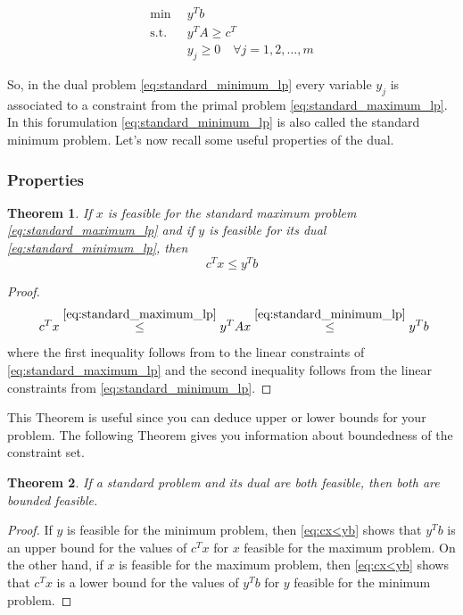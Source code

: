 \documentclass[a4paper,12pt]{article}
\newtheorem{Teo}{Theorem}
\begin{document}
\begin{equation}
\begin{aligned}  
\min \enspace &y^{T}b \\
\text{s.t.} \enspace &y^TA \geq c^T \\
&y_j \geq 0 \quad \forall j = 1,2, \dots ,m
\label{eq:standard_minimum_lp}
\end{aligned}
\end{equation}

So, in the dual problem \eqref{eq:standard_minimum_lp} every variable $y_j$ is associated to a constraint from the primal problem \eqref{eq:standard_maximum_lp}. In this forumulation \eqref{eq:standard_minimum_lp} is also called the standard minimum problem. Let's now recall some useful properties of the dual.

\subsubsection*{Properties}
\begin{Teo}
If $x$ is feasible for the standard maximum problem \eqref{eq:standard_maximum_lp} and if $y$ is feasible for its dual \eqref{eq:standard_minimum_lp}, then
\begin{equation}
c^{T}x \leq y^{T}b
\label{eq:cx<yb}
\end{equation}
\end{Teo}
\begin{proof}
\[\
c^Tx \overset{\eqref{eq:standard_maximum_lp} }{\leq} y^{T}Ax \overset{\eqref{eq:standard_minimum_lp}}{\leq} y^{T}b
\]
where the first inequality follows from to the linear constraints of \eqref{eq:standard_maximum_lp} and the second inequality follows from the linear constraints from \eqref{eq:standard_minimum_lp}.
\end{proof}

This Theorem is useful since you can deduce upper or lower bounds for your problem. The following Theorem gives you information about boundedness of the constraint set.

\begin{Teo} 
If a standard problem and its dual are both feasible, then both are bounded
feasible.
\end{Teo}

\begin{proof}
If $y$ is feasible for the minimum problem, then \eqref{eq:cx<yb} shows that $y^Tb$ is an upper bound for the values of $c^Tx$ for $x$ feasible for the maximum problem. On the other hand, if $x$ is feasible for the maximum problem, then \eqref{eq:cx<yb} shows that $c^Tx$ is a lower bound for the values of $y^Tb$ for $y$ feasible for the minimum problem.
\end{proof}
\end{document}
